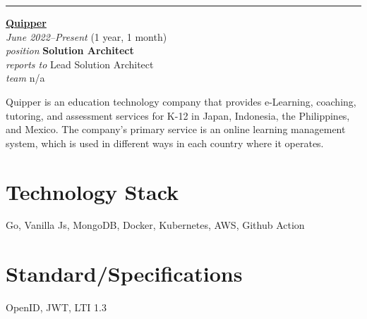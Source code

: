 \documentclass[12pt]{res} %
\begin{document}
\begin{resume}
\vspace{10pt}
\rule{1.0\textwidth}{0.1pt}

\vspace{16pt} %
\begin{minipage}[t]{6.5cm}
\begin{flushleft}
	{\large {\bf \href{https://quipper.com}{Quipper}}} \\
	{\footnotesize{\sl June 2022--Present} \hfill (1 year, 1 month)}\\
	{\footnotesize{\sl position} \hfill \bf{Solution Architect}}\\
	{\footnotesize{\sl reports to} \hfill Lead Solution Architect}\\
	{\footnotesize{\sl team} \hfill n/a}\\
\end{flushleft}
\end{minipage}
\hspace{0.5cm}
\begin{minipage}[t]{0.56\linewidth}
	Quipper is an education technology company that provides e-Learning, coaching, tutoring, and assessment services for K-12 in Japan, Indonesia, the Philippines, and Mexico. The company's primary service is an online learning management system, which is used in different ways in each country where it operates.
\end{minipage}


\begin{multicols}{2}
	\section{Technology Stack}
		Go, Vanilla Js, MongoDB, Docker, Kubernetes, AWS, Github Action
	\section{Standard/Specifications}
		OpenID, JWT, LTI 1.3
\end{multicols}


\end{resume}
\end{document}
